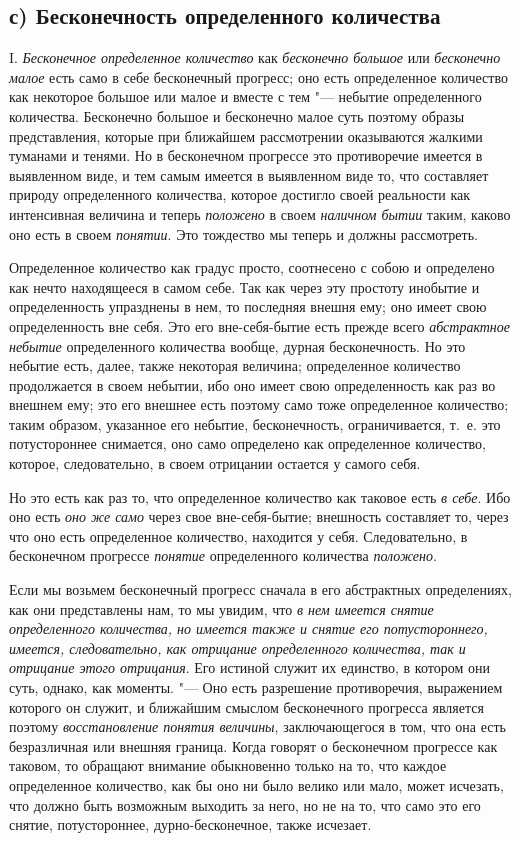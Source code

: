 \subsection[с) Бесконечность определенного количества]{с) Бесконечность определенного количества}
I. {\em Бесконечное определенное количество} как
{\em бесконечно большое} или
{\em бесконечно малое} есть само в себе бесконечный
прогресс; оно есть определенное количество как некоторое большое или малое
и вместе с тем "--- небытие определенного количества. Бесконечно большое и
бесконечно малое суть поэтому образы представления, которые при ближайшем
рассмотрении оказываются жалкими туманами и тенями. Но в бесконечном
прогрессе это противоречие имеется в выявленном виде, и тем самым имеется в
выявленном виде то, что составляет природу определенного количества,
которое достигло своей реальности как интенсивная величина и теперь
{\em положено} в своем
{\em наличном бытии} таким, каково оно есть в своем
{\em понятии}. Это тождество мы теперь и должны
рассмотреть.

Определенное количество как градус просто, соотнесено с собою и определено
как нечто находящееся в самом себе. Так как через эту простоту инобытие и
определенность упразднены в нем, то последняя внешня ему; оно имеет свою
определенность вне себя. Это его вне-себя-бытие есть прежде всего
{\em абстрактное небытие} определенного количества
вообще, дурная бесконечность. Но это небытие есть, далее, также некоторая
величина; определенное количество продолжается в своем небытии, ибо оно
имеет свою определенность как раз во внешнем ему; это его внешнее есть
поэтому само тоже определенное количество; таким образом, указанное его
небытие, бесконечность, ограничивается, т.~е. это потустороннее снимается,
оно само определено как определенное количество, которое, следовательно, в
своем отрицании остается у самого себя.

Но это есть как раз то, что определенное количество как таковое есть
{\em в себе}. Ибо оно есть {\em оно
же само} через свое вне-себя-бытие; внешность составляет то, через что оно
есть определенное количество, находится у себя. Следовательно, в
бесконечном прогрессе {\em понятие} определенного
количества {\em положено}.

Если мы возьмем бесконечный прогресс сначала в его абстрактных
определениях, как они представлены нам, то мы увидим, что
{\em в нем имеется снятие определенного количества, но
имеется также и снятие его потустороннего, имеется, следовательно, как
отрицание определенного количества, так и отрицание этого отрицания}. Его
истиной служит их единство, в котором они суть, однако, как моменты. "--- Оно
есть разрешение противоречия, выражением которого он служит, и ближайшим
смыслом бесконечного прогресса является поэтому
{\em восстановление понятия величины}, заключающегося в
том, что она есть безразличная или внешняя граница. Когда говорят о
бесконечном прогрессе как таковом, то обращают внимание обыкновенно только
на то, что каждое определенное количество, как бы оно ни было велико или
мало, может исчезать, что должно быть возможным выходить за него, но не на
то, что само это его снятие, потустороннее, дурно-бесконечное, также
исчезает.

